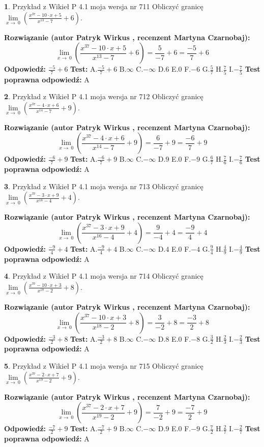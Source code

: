 \documentclass[12pt, a4paper]{article}
\theoremstyle{definition} %
\newtheorem{zad}{}
\newcommand{\zadStart}[1]{\begin{zad}#1\newline}
\newcommand{\zadStop}{\end{zad}}
\newcommand{\rozwStart}[2]{\noindent \textbf{Rozwiązanie (autor #1 , recenzent #2): }\newline}
\newcommand{\rozwStop}{\newline}
\newcommand{\odpStart}{\noindent \textbf{Odpowiedź:}\newline}
\newcommand{\odpStop}{\newline}
\newcommand{\testStart}{\noindent \textbf{Test:}\newline}
\newcommand{\testStop}{\newline}
\newcommand{\kluczStart}{\noindent \textbf{Test poprawna odpowiedź:}\newline}
\newcommand{\kluczStop}{\newline}
\begin{document}
\zadStart{Przykład z Wikieł P 4.1 moja wersja nr 711}
Obliczyć granicę $\lim\limits_{x\to\ 0}(\frac{x^{37}-10 \cdot x +5}{x^{13}-7}+6)$.
\zadStop
\rozwStart{Patryk Wirkus}{Martyna Czarnobaj}
$$\lim\limits_{x\to\ 0}(\frac{x^{37}-10 \cdot x +5}{x^{13}-7}+6)=\frac{5}{-7}+6=\frac{-5}{7}+6$$
\rozwStop
\odpStart
$\frac{-5}{7}+6$
\odpStop
\testStart
A.$\frac{-5}{7}+6$
B.$\infty$
C.$-\infty$
D.$6$
E.$0$
F.$-6$
G.$\frac{5}{7}$
H.$\frac{7}{5}$
I.$-\frac{7}{5}$
\testStop
\kluczStart
A
\kluczStop



\zadStart{Przykład z Wikieł P 4.1 moja wersja nr 712}
Obliczyć granicę $\lim\limits_{x\to\ 0}(\frac{x^{37}-4 \cdot x +6}{x^{14}-7}+9)$.
\zadStop
\rozwStart{Patryk Wirkus}{Martyna Czarnobaj}
$$\lim\limits_{x\to\ 0}(\frac{x^{37}-4 \cdot x +6}{x^{14}-7}+9)=\frac{6}{-7}+9=\frac{-6}{7}+9$$
\rozwStop
\odpStart
$\frac{-6}{7}+9$
\odpStop
\testStart
A.$\frac{-6}{7}+9$
B.$\infty$
C.$-\infty$
D.$9$
E.$0$
F.$-9$
G.$\frac{6}{7}$
H.$\frac{7}{6}$
I.$-\frac{7}{6}$
\testStop
\kluczStart
A
\kluczStop



\zadStart{Przykład z Wikieł P 4.1 moja wersja nr 713}
Obliczyć granicę $\lim\limits_{x\to\ 0}(\frac{x^{37}-3 \cdot x +9}{x^{16}-4}+4)$.
\zadStop
\rozwStart{Patryk Wirkus}{Martyna Czarnobaj}
$$\lim\limits_{x\to\ 0}(\frac{x^{37}-3 \cdot x +9}{x^{16}-4}+4)=\frac{9}{-4}+4=\frac{-9}{4}+4$$
\rozwStop
\odpStart
$\frac{-9}{4}+4$
\odpStop
\testStart
A.$\frac{-9}{4}+4$
B.$\infty$
C.$-\infty$
D.$4$
E.$0$
F.$-4$
G.$\frac{9}{4}$
H.$\frac{4}{9}$
I.$-\frac{4}{9}$
\testStop
\kluczStart
A
\kluczStop



\zadStart{Przykład z Wikieł P 4.1 moja wersja nr 714}
Obliczyć granicę $\lim\limits_{x\to\ 0}(\frac{x^{37}-10 \cdot x +3}{x^{18}-2}+8)$.
\zadStop
\rozwStart{Patryk Wirkus}{Martyna Czarnobaj}
$$\lim\limits_{x\to\ 0}(\frac{x^{37}-10 \cdot x +3}{x^{18}-2}+8)=\frac{3}{-2}+8=\frac{-3}{2}+8$$
\rozwStop
\odpStart
$\frac{-3}{2}+8$
\odpStop
\testStart
A.$\frac{-3}{2}+8$
B.$\infty$
C.$-\infty$
D.$8$
E.$0$
F.$-8$
G.$\frac{3}{2}$
H.$\frac{2}{3}$
I.$-\frac{2}{3}$
\testStop
\kluczStart
A
\kluczStop



\zadStart{Przykład z Wikieł P 4.1 moja wersja nr 715}
Obliczyć granicę $\lim\limits_{x\to\ 0}(\frac{x^{37}-2 \cdot x +7}{x^{19}-2}+9)$.
\zadStop
\rozwStart{Patryk Wirkus}{Martyna Czarnobaj}
$$\lim\limits_{x\to\ 0}(\frac{x^{37}-2 \cdot x +7}{x^{19}-2}+9)=\frac{7}{-2}+9=\frac{-7}{2}+9$$
\rozwStop
\odpStart
$\frac{-7}{2}+9$
\odpStop
\testStart
A.$\frac{-7}{2}+9$
B.$\infty$
C.$-\infty$
D.$9$
E.$0$
F.$-9$
G.$\frac{7}{2}$
H.$\frac{2}{7}$
I.$-\frac{2}{7}$
\testStop
\kluczStart
A
\kluczStop
\end{document}
